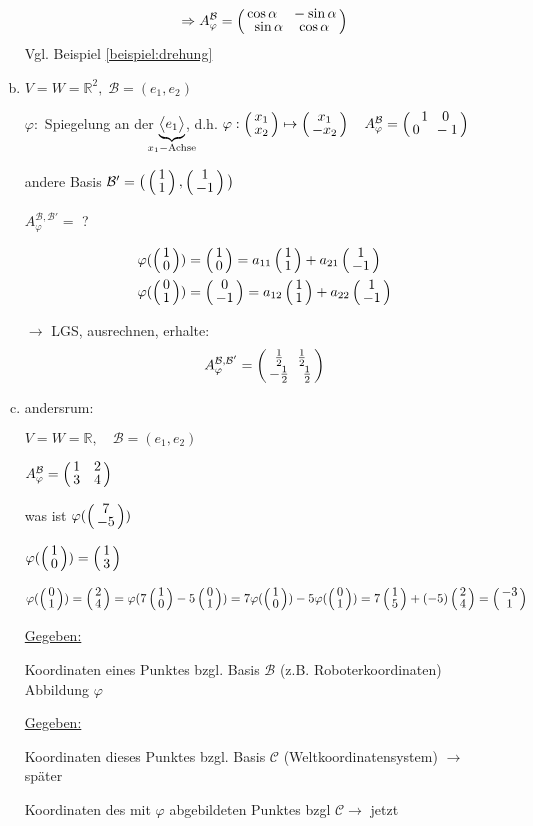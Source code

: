 \begin{enumerate}[a)]
	\[\Rightarrow A_\varphi^\mathcal{B} = \weirdvct{\cos \alpha \quad -\sin \alpha}{\sin \alpha\quad \cos \alpha}\]
	Vgl. Beispiel \ref{beispiel:drehung}
	
	\item
	$V=W=\mathbb{R}^2,\; \mathcal{B} = (e_1,e_2)$
	
	$\varphi:$ Spiegelung an der $\underbrace{\big<e_1\big>}_{\mathclap{x_1-\text{Achse}}}$, d.h. $\varphi:\weirdvct{x_1}{x_2}\mapsto \weirdvct{x_1}{-x_2}\quad
	A_\varphi^\mathcal{B} = \weirdvct{1\quad0}{0\quad-1}$
	
	andere Basis $\mathcal{B}' = \big(\weirdvct{1}{1},\weirdvct{1}{-1}\big)$
	
	$A_\varphi^{\mathcal{B},\mathcal{B}'} =$ ?
	
	\begin{align*}
	\varphi(\weirdvct{1}{0}) &= \weirdvct{1}{0} = a_{11}\weirdvct{1}{1} + a_{21}\weirdvct{1}{-1}\\
	\varphi(\weirdvct{0}{1}) &= \weirdvct{0}{-1} = a_{12}\weirdvct{1}{1} + a_{22}\weirdvct{1}{-1}\\
	\end{align*}
	
	$\rightarrow$ LGS, ausrechnen, erhalte:
	\[A_\varphi^{\mathcal{B},\mathcal{B}'} = \weirdvct{\frac{1}{2}\quad \frac{1}{2}}{-\frac{1}{2}\quad \frac{1}{2}}\]
	
	\item
	andersrum:
	
	$V=W=\mathbb{R}, \quad \mathcal{B}=(e_1,e_2)$
	
	$A_\varphi^\mathcal{B} = \weirdvct{1\quad2}{3\quad4}$
	
	was ist $\varphi(\weirdvct{7}{-5})$
	
	$\varphi(\weirdvct{1}{0}) = \weirdvct{1}{3}$
	
	$\varphi(\weirdvct{0}{1}) = \weirdvct{2}{4} = \varphi(7 \weirdvct{1}{0} - 5 \weirdvct{0}{1}) = 7 \varphi(\weirdvct{1}{0}) -
	5 \varphi(\weirdvct{0}{1}) = 7 \weirdvct{1}{5} + (-5) \weirdvct{2}{4} = \weirdvct{-3}{1}$\bigskip
	
	\underline{Gegeben:}
	
	Koordinaten eines Punktes bzgl. Basis $\mathcal{B}$ (z.B. Roboterkoordinaten) Abbildung $\varphi$
	
	\underline{Gegeben:}
	
	Koordinaten dieses Punktes bzgl. Basis $\mathcal{C}$ (Weltkoordinatensystem) $\rightarrow$ später
	
	Koordinaten des mit $\varphi$ abgebildeten Punktes bzgl $\mathcal{C} \rightarrow$ jetzt
	
\end{enumerate}



\subsection{}

\subsection{}